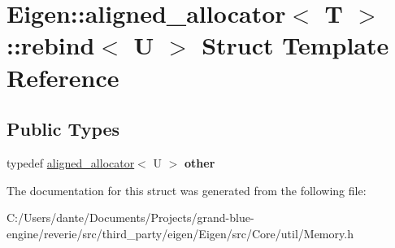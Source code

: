 \hypertarget{struct_eigen_1_1aligned__allocator_1_1rebind}{}\section{Eigen\+::aligned\+\_\+allocator$<$ T $>$\+::rebind$<$ U $>$ Struct Template Reference}
\label{struct_eigen_1_1aligned__allocator_1_1rebind}
\subsection*{Public Types}
\begin{DoxyCompactItemize}
\item 
\mbox{\label{struct_eigen_1_1aligned__allocator_1_1rebind_aed3b0e11c4712793af0e508d9d8f4ade}} 
typedef \mbox{\hyperlink{class_eigen_1_1aligned__allocator}{aligned\+\_\+allocator}}$<$ U $>$ {\bfseries other}
\end{DoxyCompactItemize}


The documentation for this struct was generated from the following file\+:\begin{DoxyCompactItemize}
\item 
C\+:/\+Users/dante/\+Documents/\+Projects/grand-\/blue-\/engine/reverie/src/third\+\_\+party/eigen/\+Eigen/src/\+Core/util/Memory.\+h\end{DoxyCompactItemize}
